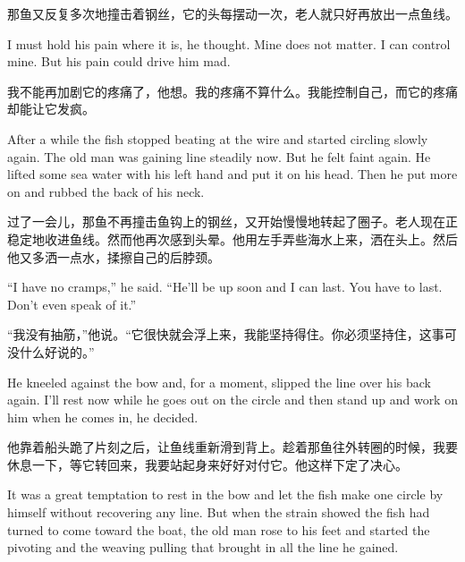 \begin{paracol}{2}
\switchcolumn

那鱼又反复多次地撞击着钢丝，它的头每摆动一次，老人就只好再放出一点鱼线。

\switchcolumn*

I must hold his pain where it is, he thought. Mine does not matter. I can
control mine. But his pain could drive him mad.

\switchcolumn

我不能再加剧它的疼痛了，他想。我的疼痛不算什么。我能控制自己，而它的疼痛却能让它发疯。

\switchcolumn*

After a while the fish stopped beating at the wire and started circling
slowly again. The old man was gaining line steadily now. But he felt faint
again. He lifted some sea water with his left hand and put it on his head.
Then he put more on and rubbed the back of his neck.

\switchcolumn

过了一会儿，那鱼不再撞击鱼钩上的钢丝，又开始慢慢地转起了圈子。老人现在正稳定地收进鱼线。然而他再次感到头晕。他用左手弄些海水上来，洒在头上。然后他又多洒一点水，揉擦自己的后脖颈。

\switchcolumn*

``I have no cramps,'' he said. ``He'll be up soon and I can last. You have
to last. Don't even speak of it.''

\switchcolumn

“我没有抽筋，”他说。“它很快就会浮上来，我能坚持得住。你必须坚持住，这事可没什么好说的。”

\switchcolumn*

He kneeled against the bow and, for a moment, slipped the line over his back
again. I'll rest now while he goes out on the circle and then stand up and
work on him when he comes in, he decided.

\switchcolumn

他靠着船头跪了片刻之后，让鱼线重新滑到背上。趁着那鱼往外转圈的时候，我要休息一下，等它转回来，我要站起身来好好对付它。他这样下定了决心。

\switchcolumn*

It was a great temptation to rest in the bow and let the fish make one
circle by himself without recovering any line. But when the strain showed
the fish had turned to come toward the boat, the old man rose to his feet
and started the pivoting and the \gls{weaving} pulling that brought in all the
line he gained.

\switchcolumn


\end{paracol}

